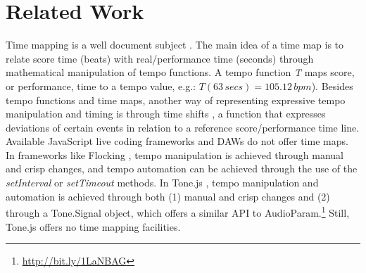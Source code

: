 \documentclass{sig-alternate}
\begin{document}
\section{Related Work}
Time mapping is a well document subject \cite{Dannenberg:1997,Kirke:2009,honing:time2time,wheresthebeat,honing:1993}. The main idea of a time map is to relate score time (beats) with real/performance time (seconds) through mathematical manipulation of  tempo functions. A tempo function \textit{T} maps score, or performance, time to a tempo value, e.g.: $T(63\,secs) = 105.12\,bpm$). Besides tempo functions and time maps, another way of representing expressive tempo manipulation and timing is through time shifts \cite{honing:time2time}, a function that expresses deviations of certain events in relation to a reference score/performance time line. Available JavaScript live coding frameworks and DAWs do not offer time maps. In frameworks like Flocking \cite{flocking:icmc2014}, tempo manipulation is achieved through manual and crisp changes, and tempo automation can be achieved through the use of the \textit{setInterval} or \textit{setTimeout} methods. In Tone.js \cite{tonejs:wac2015}, tempo manipulation and automation is achieved through both (1) manual and crisp changes and (2) through a Tone.Signal object, which offers a similar API to AudioParam.\footnote{\url{http://bit.ly/1LaNBAG}} Still, Tone.js offers no time mapping facilities.
\end{document}

